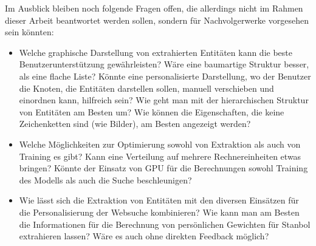 Im Ausblick bleiben noch folgende Fragen offen, die allerdings nicht im Rahmen dieser Arbeit beantwortet werden sollen, sondern für Nachvolgerwerke vorgesehen sein könnten:
\begin{itemize}
\item Welche graphische Darstellung von extrahierten Entitäten kann die beste Benutzerunterstützung gewährleisten? Wäre eine baumartige Struktur besser, als eine flache Liste? Könnte eine personalisierte Darstellung, wo der Benutzer die Knoten, die Entitäten darstellen sollen, manuell verschieben und einordnen kann, hilfreich sein? Wie geht man mit der hierarchischen Struktur von Entitäten am Besten um? Wie können die Eigenschaften, die keine Zeichenketten sind (wie Bilder), am Besten angezeigt werden?
\item Welche Möglichkeiten zur Optimierung sowohl von Extraktion als auch von Training es gibt? Kann eine Verteilung auf mehrere Rechnereinheiten etwas bringen? Könnte der Einsatz von GPU für die Berechnungen sowohl Training des Modells als auch die Suche beschleunigen?
\item Wie lässt sich die Extraktion von Entitäten mit den diversen Einsätzen für die Personalisierung der Websuche kombinieren? Wie kann man am Besten die Informationen für die Berechnung von persönlichen Gewichten für Stanbol extrahieren lassen? Wäre es auch ohne direkten Feedback möglich?
\end{itemize}